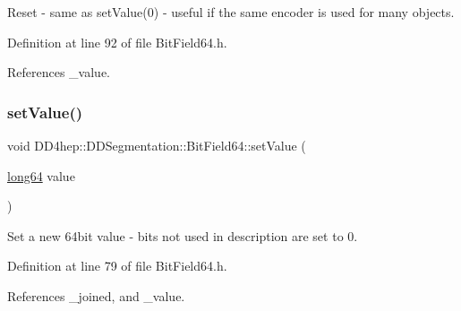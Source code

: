 Reset -\/ same as set\+Value(0) -\/ useful if the same encoder is used for many objects. 

Definition at line 92 of file Bit\+Field64.\+h.



References \+\_\+value.

\hypertarget{class_d_d4hep_1_1_d_d_segmentation_1_1_bit_field64_a525ef87b1f0e9ff00a072102ac2f9457}{}\label{class_d_d4hep_1_1_d_d_segmentation_1_1_bit_field64_a525ef87b1f0e9ff00a072102ac2f9457} 
\subsubsection{\texorpdfstring{set\+Value()}{setValue()}\hspace{0.1cm}{\footnotesize\ttfamily [1/2]}}
{\footnotesize\ttfamily void D\+D4hep\+::\+D\+D\+Segmentation\+::\+Bit\+Field64\+::set\+Value (\begin{DoxyParamCaption}\item[{\hyperlink{namespace_d_d4hep_ac2a70e722b33dc7ddaa20db8954ac836}{long64}}]{value }\end{DoxyParamCaption})\hspace{0.3cm}{\ttfamily [inline]}}

Set a new 64bit value -\/ bits not used in description are set to 0. 

Definition at line 79 of file Bit\+Field64.\+h.



References \+\_\+joined, and \+\_\+value.



